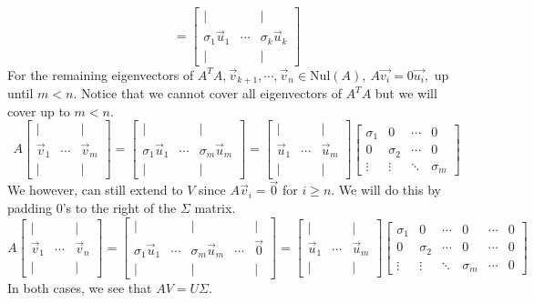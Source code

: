 \begin{enumerate}
{$$    =  \begin{bmatrix} | & \ & | \\ \sigma_{1} \vec{u}_{1} & \cdots & \sigma_{k} \vec{u}_{k} \\ | & \ & | \end{bmatrix}$$
    For the remaining eigenvectors of $A^{T}A, \vec{v}_{k + 1}, \cdots, \vec{v}_{n} \in \text{Nul}(A), \ A \vec{v_{i}} = 0 \vec{u_{i}},$ up until $m < n.$ Notice that we cannot cover all eigenvectors of $A^{T} A$ but we will cover up to $m < n.$
    $$A \begin{bmatrix} | & \ & | \\
    \vec{v}_{1} & \cdots & \vec{v}_{m}  \\ | & \ & | \end{bmatrix} = 
    \begin{bmatrix} | & \ & | \\ \sigma_{1} \vec{u}_{1} & \cdots & \sigma_{m} \vec{u}_{m} \\ | & \ & | \end{bmatrix} = 
     \begin{bmatrix} | & \ & | \\ \vec{u}_{1} & \cdots & \vec{u}_{m} \\ | & \ & | \end{bmatrix} \begin{bmatrix} \sigma_{1} & 0 &  \cdots & 0 \\ 0 & \sigma_{2} & \cdots & 0 \\ \vdots & \vdots & \ddots & \sigma_{m} \end{bmatrix}$$
    We however, can still extend to $V$ since $A \vec{v}_{i} = \vec{0}$ for $i \geq n.$ We will do this by padding $0$'s to the right of the $\Sigma$ matrix.
    $$A \begin{bmatrix} | & \ & | \\
    \vec{v}_{1} & \cdots & \vec{v}_{n}  \\ | & \ & | \end{bmatrix} = 
    \begin{bmatrix} | & \ & | &  & | \\ \sigma_{1} \vec{u}_{1} & \cdots & \sigma_{m} \vec{u}_{m} & \cdots & \vec{0} \\ | & \ & | &  & | \end{bmatrix} = 
     \begin{bmatrix} | & \ & | \\ \vec{u}_{1} & \cdots & \vec{u}_{m} \\ | & \ & | \end{bmatrix} \begin{bmatrix} \sigma_{1} & 0 & \cdots & 0 & \cdots & 0 \\ 0 & \sigma_{2} & \cdots & 0 & \cdots & 0 \\ \vdots & \vdots & \ddots & \sigma_{m} & \cdots&  0 \end{bmatrix}$$
    In both cases, we see that $AV = U\Sigma .$
  }


\end{enumerate}
